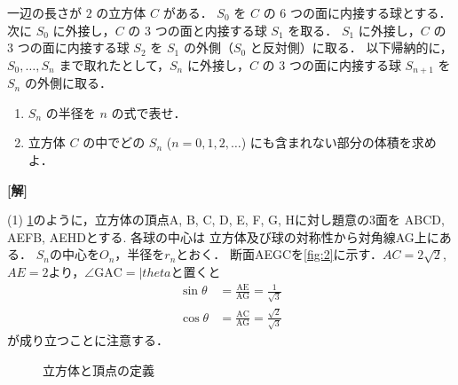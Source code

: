 \documentclass[a4paper,10pt]{ltjsarticle}
\begin{document}
\begin{oframed}
一辺の長さが $2$ の立方体 $C$ がある．
$S_0$ を $C$ の $6$ つの面に内接する球とする．
次に $S_0$ に外接し，$C$ の $3$ つの面と内接する球 $S_1$ を取る．
$S_1$ に外接し，$C$ の $3$ つの面に内接する球 $S_2$ を $S_1$ の外側（$S_0$ と反対側）に取る．
以下帰納的に，$S_0, \ldots, S_n$ まで取れたとして，$S_n$ に外接し，$C$ の $3$ つの面に内接する球 $S_{n+1}$ を $S_n$ の外側に取る．
    \begin{enumerate}
        \item $S_n$ の半径を $n$ の式で表せ．
        \item 立方体 $C$ の中でどの $S_n$ ($n=0,1,2,\ldots$) にも含まれない部分の体積を求めよ．
    \end{enumerate}
\end{oframed}
\setlength{\columnseprule}{0.4pt}
\begin{multicols}{2}
{\bf[解]}

(1)
\cref{fig:1}のように，立方体の頂点A, B, C, D, E, F, G, Hに対し題意の3面を
ABCD, AEFB, AEHDとする. 各球の中心は
立方体及び球の対称性から対角線AG上にある．
$S_n$の中心を$O_n$，半径を$r_n$とおく．
断面AEGCを\cref{fig:2}に示す．$AC=2\sqrt{2}$,$AE=2$より，$\angle\mathrm{GAC}=|theta$と置くと
\begin{align}
    \sin\theta &= \frac{\mathrm{AE}}{\mathrm{AG}} = \frac{1}{\sqrt{3}} \label{eq:1}\\
    \cos\theta &= \frac{\mathrm{AC}}{\mathrm{AG}} = \frac{\sqrt{2}}{\sqrt{3}} \label{eq:2}
\end{align}
が成り立つことに注意する．

\begin{figure}[H]
\centering
{}
\caption{立方体と頂点の定義}
\label{fig:1}
\end{figure}


\end{multicols}
\end{document}
